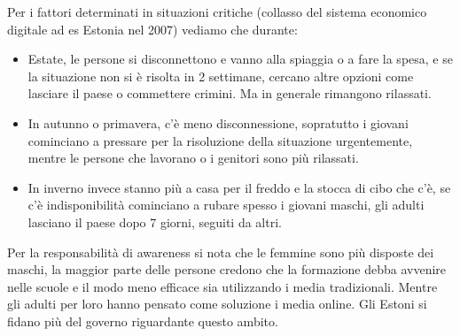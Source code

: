\documentclass[a4page, 11pt, twocolumn]{article}
\begin{document}
Per i fattori determinati in situazioni critiche (collasso del sistema
economico digitale ad es Estonia nel 2007) vediamo che durante:

\begin{itemize}
	\item
	Estate, le persone si disconnettono e vanno alla spiaggia o a fare la
	spesa, e se la situazione non si è risolta in 2 settimane, cercano
	altre opzioni come lasciare il paese o commettere crimini. Ma in
	generale rimangono rilassati.
	\item
	In autunno o primavera, c'è meno disconnessione, sopratutto i giovani
	cominciano a pressare per la risoluzione della situazione
	urgentemente, mentre le persone che lavorano o i genitori sono più
	rilassati.
	\item
	In inverno invece stanno più a casa per il freddo e la stocca di cibo
	che c'è, se c'è indisponibilità cominciano a rubare spesso i giovani
	maschi, gli adulti lasciano il paese dopo 7 giorni, seguiti da altri.
\end{itemize}

Per la responsabilità di awareness si nota che le femmine sono più
disposte dei maschi, la maggior parte delle persone credono che la
formazione debba avvenire nelle scuole e il modo meno efficace sia
utilizzando i media tradizionali. Mentre gli adulti per loro hanno
pensato come soluzione i media online. Gli Estoni si fidano più del
governo riguardante questo ambito.
\end{document}

